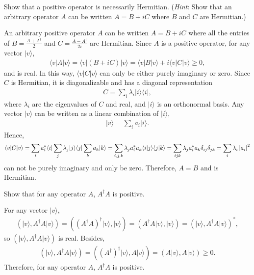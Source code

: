 \documentclass[en]{sol-man}
\begin{document}
\begin{exe}
    Show that a positive operator is necessarily Hermitian. (\emph{Hint}: Show that an arbitrary operator $A$ can be written $A=B+iC$ where $B$ and $C$ are Hermitian.)
\end{exe}
\begin{pf}
    An arbitrary positive operator $A$ can be written $A=B+iC$ where all the entries of $B=\frac{A+A^{\dagger}}{2}$ and $C=\frac{A-A^{\dagger}}{2i}$ are Hermitian. Since $A$ is a positive operator, for any vector $\lvert v\rangle$,
    \begin{align}
        \langle v\rvert A\lvert v\rangle=\langle v\rvert(B+iC)\lvert v\rangle=\langle v\rvert B\lvert v\rangle+i\langle v\rvert C\lvert v\rangle\geq 0,
    \end{align}
    and is real. In this way, $\langle v\rvert C\lvert v\rangle$ can only be either purely imaginary or zero. Since $C$ is Hermitian, it is diagonalizable and has a diagonal representation
    \begin{align}
        C=\sum_i\lambda_i\lvert i\rangle\langle i\rvert,
    \end{align}
    where $\lambda_i$ are the eigenvalues of $C$ and real, and $\lvert i\rangle$ is an orthonormal basis. Any vector $\lvert v\rangle$ can be written as a linear combination of $\lvert i\rangle$,
    \begin{align}
        \lvert v\rangle=\sum_ia_i\lvert i\rangle.
    \end{align}
    Hence,
    \begin{align}
        \langle v\rvert C\lvert v\rangle=\sum_ia_i^*\langle i\rvert \sum_j\lambda_j\lvert j\rangle\langle j\rvert\sum_ka_k\lvert k\rangle=\sum_{i,j,k}\lambda_ja_i^*a_k\langle i\vert j\rangle\langle j\vert k\rangle=\sum_{ijk}\lambda_ja_i^*a_k\delta_{ij}\delta_{jk}=\sum_i\lambda_i\left\lvert a_i\right\rvert^2
    \end{align}
    can not be purely imaginary and only be zero. Therefore, $A=B$ and is Hermitian.
\end{pf}

\begin{exe}
    Show that for any operator $A$, $A^{\dagger}A$ is positive.
\end{exe}
\begin{pf}
    For any vector $\lvert v\rangle$,
    \begin{align}
        (\lvert v\rangle,A^{\dagger}A\lvert v\rangle)=((A^{\dagger}A)^{\dagger}\lvert v\rangle,\lvert v\rangle)=(A^{\dagger}A\lvert v\rangle,\lvert v\rangle)=(\lvert v\rangle,A^{\dagger}A\lvert v\rangle)^*,
    \end{align}
    so $(\lvert v\rangle,A^{\dagger}A\lvert v\rangle)$ is real. Besides,
    \begin{align}
        (\lvert v\rangle,A^{\dagger}A\lvert v\rangle)=((A^{\dagger})^{\dagger}\lvert v\rangle,A\lvert v\rangle)=(A\lvert v\rangle,A\lvert v\rangle)\geq 0.
    \end{align}
    Therefore, for any operator $A$, $A^{\dagger}A$ is positive.
\end{pf}
\end{document}
